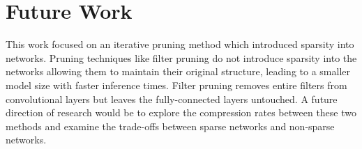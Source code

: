 \documentclass[conference]{IEEEtran}
\begin{document}
\section{Future Work}
This work focused on an iterative pruning method which introduced sparsity into networks. Pruning techniques like filter pruning do not introduce sparsity into the networks allowing them to maintain their original structure, leading to a smaller model size with faster inference times. Filter pruning removes entire filters from convolutional layers but leaves the fully-connected layers untouched. A future direction of research would be to explore the compression rates between these two methods and examine the trade-offs between sparse networks and non-sparse networks.




\end{document}
